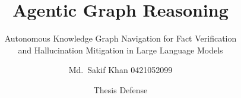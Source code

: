 \newcommand{\centrebody}{\par\vskip 0pt plus 1filll\relax}
\newcommand{\bodyshift}[1]{\vspace*{2\dimexpr #1\relax}}
\newcommand{\takeaway}[1]{%
  \par\vspace{1mm}\vskip 0pt plus 1filll\relax%
  \moveright4bp\vbox{%
    \begin{beamercolorbox}[wd=\dimexpr\textwidth-8bp\relax,sep=1.8mm,
      rounded=true]{takeawaybar}%
      \small\raggedright
      \leftskip=\dimexpr1.8mm-4bp\relax \rightskip=\leftskip
      \textbf{#1}%
    \end{beamercolorbox}}}

\title{Agentic Graph Reasoning}
\subtitle{Autonomous Knowledge Graph Navigation for Fact
  Verification\texorpdfstring{\\}{} and Hallucination Mitigation in Large
  Language Models}
\author{Md.\ Sakif Khan
  \texorpdfstring{\quad\textnormal{\small 0421052099}}{(0421052099)}}
\date{\small Thesis Defense}

